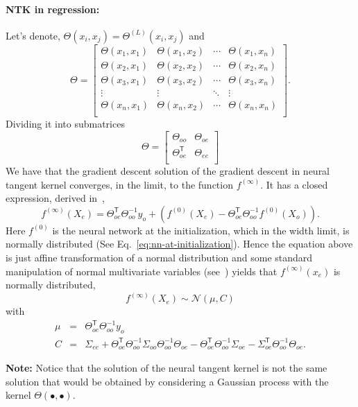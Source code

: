\documentclass[a4paper,10pt]{article}
\newcommand{\trnsp}{\mathsf{T}}
\newcommand{\N}{\mathcal{N}}
\newenvironment{note}
{
\begin{center}
\begin{lrbox}{\mybox}
\begin{minipage}{42em}}
{\end{minipage}
\end{lrbox}\fbox{\usebox{\mybox}}
\end{center}}
\begin{document}
\paragraph{NTK in regression:} Let's denote, $\Theta(x_i, x_j) = \Theta^{(L)}(x_i, x_j)$ and
\begin{equation}
    \Theta
    =
    \begin{bmatrix}
    \Theta(x_1, x_1) & \Theta(x_1, x_2) & \cdots & \Theta(x_1, x_n)\\
    \Theta(x_2, x_1) & \Theta(x_2, x_2) & \cdots & \Theta(x_2, x_n)\\
    \Theta(x_3, x_1) & \Theta(x_3, x_2) & \cdots & \Theta(x_3, x_n)\\
    \vdots & \vdots & \ddots & \vdots\\
    \Theta(x_n, x_1) & \Theta(x_n, x_2) & \cdots & \Theta(x_n, x_n)\\
    \end{bmatrix}.
\end{equation}
Dividing it into submatrices
\begin{equation}
\Theta
    =
\begin{bmatrix}
    \Theta_{oo} & \Theta_{oe} \\
    \Theta_{oe}^\trnsp & \Theta_{ee} \\
\end{bmatrix}
\end{equation}
We have that the gradient descent solution of the gradient descent in neural tangent kernel converges, in the limit, to the function $f^{(\infty)}$. It has a closed expression,  derived in~\cite[Section 5]{jacot_neural_2018},
\begin{equation}
f^{(\infty)}(X_e) = \Theta_{oe}^\trnsp \Theta_{oo}^{-1} y_o  +  \left( f^{(0)}(X_e) - \Theta_{oe}^\trnsp \Theta_{oo}^{-1}  f^{(0)}(X_o)\right).
\end{equation}
Here $f^{(0)}$ is the neural network at the initialization, which in the width limit, is normally distributed (See Eq.~\eqref{eq:nn-at-initialization}). Hence the equation above is just affine transformation of a normal distribution and some standard manipulation of normal multivariate variables (see~\citet[Section 9.A, Corollary 9.2]{lindholm_machine_2022})
yields that $f^{(\infty)}(x_e)$ is normally distributed,
\begin{equation}
f^{(\infty)}(X_e) \sim \N(\mu,  C)
\end{equation}
with
\begin{eqnarray*}
    \mu &=& \Theta_{oe}^\trnsp \Theta_{oo}^{-1} y_o\\
    C &=& \Sigma_{ee} + \Theta_{oe}^\trnsp \Theta_{oo}^{-1} \Sigma_{oo} \Theta_{oo}^{-1}  \Theta_{oe}
          -  \Theta_{oe}^\trnsp  \Theta_{oo}^{-1}  \Sigma_{oe} -  \Sigma_{oe}^\trnsp \Theta_{oo}^{-1}  \Theta_{oe}.
\end{eqnarray*}
\begin{note}
    \textbf{Note:} Notice that the solution of the neural tangent kernel is not the same solution that would be obtained by considering a Gaussian process with the kernel $\Theta(\bullet, \bullet)$.
\end{note}
\end{document}
